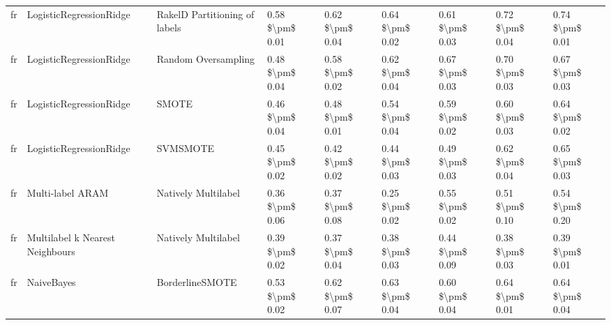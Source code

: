 \begin{tabular}{lllllllll}
      fr &         LogisticRegressionRidge & RakelD Partitioning of labels &     0.58 \$\textbackslash pm\$ 0.01 &           0.62 \$\textbackslash pm\$ 0.04 &       0.64 \$\textbackslash pm\$ 0.02 &        0.61 \$\textbackslash pm\$ 0.03 &                         0.72 \$\textbackslash pm\$ 0.04 &     0.74 \$\textbackslash pm\$ 0.01 \\
      fr &         LogisticRegressionRidge &           Random Oversampling &     0.48 \$\textbackslash pm\$ 0.04 &           0.58 \$\textbackslash pm\$ 0.02 &       0.62 \$\textbackslash pm\$ 0.04 &        0.67 \$\textbackslash pm\$ 0.03 &                         0.70 \$\textbackslash pm\$ 0.03 &     0.67 \$\textbackslash pm\$ 0.03 \\
      fr &         LogisticRegressionRidge &                         SMOTE &     0.46 \$\textbackslash pm\$ 0.04 &           0.48 \$\textbackslash pm\$ 0.01 &       0.54 \$\textbackslash pm\$ 0.04 &        0.59 \$\textbackslash pm\$ 0.02 &                         0.60 \$\textbackslash pm\$ 0.03 &     0.64 \$\textbackslash pm\$ 0.02 \\
      fr &         LogisticRegressionRidge &                      SVMSMOTE &     0.45 \$\textbackslash pm\$ 0.02 &           0.42 \$\textbackslash pm\$ 0.02 &       0.44 \$\textbackslash pm\$ 0.03 &        0.49 \$\textbackslash pm\$ 0.03 &                         0.62 \$\textbackslash pm\$ 0.04 &     0.65 \$\textbackslash pm\$ 0.03 \\
      fr &                Multi-label ARAM &           Natively Multilabel &     0.36 \$\textbackslash pm\$ 0.06 &           0.37 \$\textbackslash pm\$ 0.08 &       0.25 \$\textbackslash pm\$ 0.02 &        0.55 \$\textbackslash pm\$ 0.02 &                         0.51 \$\textbackslash pm\$ 0.10 &     0.54 \$\textbackslash pm\$ 0.20 \\
      fr & Multilabel k Nearest Neighbours &           Natively Multilabel &     0.39 \$\textbackslash pm\$ 0.02 &           0.37 \$\textbackslash pm\$ 0.04 &       0.38 \$\textbackslash pm\$ 0.03 &        0.44 \$\textbackslash pm\$ 0.09 &                         0.38 \$\textbackslash pm\$ 0.03 &     0.39 \$\textbackslash pm\$ 0.01 \\
      fr &                      NaiveBayes &               BorderlineSMOTE &     0.53 \$\textbackslash pm\$ 0.02 &           0.62 \$\textbackslash pm\$ 0.07 &       0.63 \$\textbackslash pm\$ 0.04 &        0.60 \$\textbackslash pm\$ 0.04 &                         0.64 \$\textbackslash pm\$ 0.01 &     0.64 \$\textbackslash pm\$ 0.04 \\

\end{tabular}
